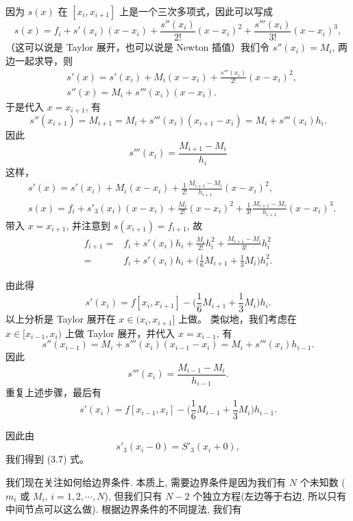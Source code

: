 \documentclass[a4paper]{ctexart}
\begin{document}
{因为 $s(x)$ 在 $[x_i, x_{i+1}]$ 上是一个三次多项式，因此可以写成
$$
s(x) = f_i + s'(x_i)(x-x_i) + \frac{s''(x_i)}{2!}(x - x_i)^2 + \frac{s'''(x_i)}{3!}(x-x_i)^3,
$$
（这可以说是 Taylor 展开，也可以说是 Newton 插值）我们令 $s''(x_i) = M_i$, 两边一起求导，则
\begin{align*}
&s'(x) = s'(x_i) + M_i(x - x_i) + \frac{s'''(x_i)}{2!}(x - x_i)^2,\\
&s''(x) = M_i + s'''(x_i)(x - x_i).
\end{align*}
于是代入 $x = x_{i + 1}$, 有
$$
 s''(x_{i + 1}) = M_{i + 1} = M_i + s'''(x_i)(x_{i + 1} - x_i) = M_i + s'''(x_i)h_{i}.
$$
因此
$$
s'''(x_i) = \frac{M_{i + 1} - M_i}{h_{i}}
$$
这样，
\begin{align*}
&s'(x) = s'(x_i) + M_i(x - x_i) + \frac{1}{2!}\frac{M_{i + 1} - M_i}{h_{i + 1}}(x - x_i)^2,\\
&s(x) = f_i + s'_3(x_i)(x - x_i) + \frac{M_i}{2!}(x - x_i)^2 + \frac{1}{3!}\frac{M_{i + 1} - M_i}{h_{i + 1}}(x - x_i)^3.
\end{align*}
带入 $x = x_{i + 1}$, 并注意到 $s(x_{i + 1}) = f_{i + 1}$, 故
\begin{align*}
f_{i + 1} = & f_i + s'(x_i)h_{i} + \frac{M_i}{2!}h_{i}^2 + \frac{M_{i + 1} - M_i}{3!}h_{i}^2\\
=&
f_i + s'(x_i)h_{i} + \Big(\frac{1}{6}M_{i + 1} + \frac{1}{3}M_i\Big)h_{i}^2.
\end{align*}

由此得
$$
s'(x_i) = f[x_i, x_{i + 1}] - \Big(\frac{1}{6}M_{i + 1} + \frac{1}{3}M_i\Big)h_{i}.
$$
以上分析是 Taylor 展开在 $x \in (x_i, x_{i + 1}]$ 上做。
类似地，我们考虑在 $x \in [x_{i - 1}, x_i)$ 上做 Taylor 展开，并代入 $x = x_{i - 1}$, 有
$$
 s''(x_{i - 1}) =  M_i + s'''(x_i)(x_{i - 1} - x_i) = M_i + s'''(x_i)h_{i - 1}.
$$
因此
$$
s'''(x_i) = \frac{M_{i - 1} - M_i}{h_{i - 1}}.
$$
重复上述步骤，最后有
$$
s'(x_i) = f[x_{i - 1}, x_{i}] - \Big(\frac{1}{6}M_{i - 1} + \frac{1}{3}M_i\Big)h_{i - 1}.
$$

因此由
$$
s'_3(x_i - 0) = S'_3(x_i + 0),
$$
我们得到 (3.7) 式。

我们现在关注如何给边界条件. 本质上, 需要边界条件是因为我们有 $N$ 个未知数
($m_i$ 或 $M_i$, $i = 1, 2, \cdots, N$), 但我们只有 $N - 2$ 
个独立方程(左边等于右边, 所以只有中间节点可以这么做). 根据边界条件的不同提法, 
我们有

}
\end{document}
